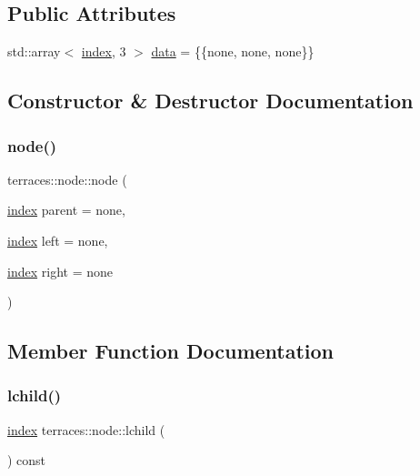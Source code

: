 \subsection*{Public Attributes}
\begin{DoxyCompactItemize}
\item 
std\+::array$<$ \hyperlink{namespaceterraces_adbc33ccb543d1634e96d0eb02e472c77}{index}, 3 $>$ \hyperlink{structterraces_1_1node_aee217f5c4b1af9fc69f59b278f656663}{data} = \{\{none, none, none\}\}
\end{DoxyCompactItemize}


\subsection{Constructor \& Destructor Documentation}
\mbox{\label{structterraces_1_1node_aeeaecca04dbbd90b944666d8e1a5c3dc}} 
\subsubsection{\texorpdfstring{node()}{node()}}
{\footnotesize\ttfamily terraces\+::node\+::node (\begin{DoxyParamCaption}\item[{\hyperlink{namespaceterraces_adbc33ccb543d1634e96d0eb02e472c77}{index}}]{parent = {\ttfamily none},  }\item[{\hyperlink{namespaceterraces_adbc33ccb543d1634e96d0eb02e472c77}{index}}]{left = {\ttfamily none},  }\item[{\hyperlink{namespaceterraces_adbc33ccb543d1634e96d0eb02e472c77}{index}}]{right = {\ttfamily none} }\end{DoxyParamCaption})\hspace{0.3cm}{\ttfamily [inline]}}



\subsection{Member Function Documentation}
\mbox{\label{structterraces_1_1node_a934dadc0e2108504ac7634300d27c3b0}} 
\subsubsection{\texorpdfstring{lchild()}{lchild()}\hspace{0.1cm}{\footnotesize\ttfamily [1/2]}}
{\footnotesize\ttfamily \hyperlink{namespaceterraces_adbc33ccb543d1634e96d0eb02e472c77}{index} terraces\+::node\+::lchild (\begin{DoxyParamCaption}{ }\end{DoxyParamCaption}) const\hspace{0.3cm}{\ttfamily [inline]}}


